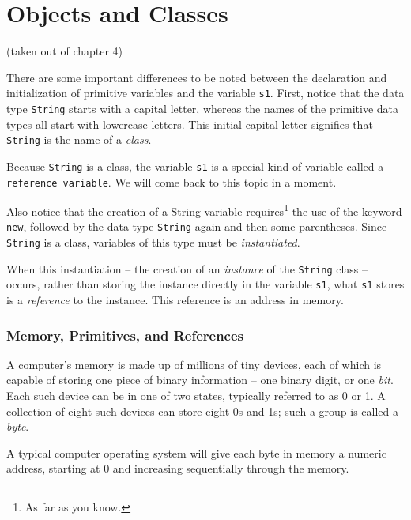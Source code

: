 
\chapter{Objects and Classes}

\minitoc

(taken out of chapter 4)

There are some important differences to be noted between the declaration and initialization of primitive variables and the variable \lstinline{s1}.  First, notice that the data type \lstinline{String} starts with a capital letter, whereas the names of the primitive data types all start with lowercase letters.  This initial capital letter signifies that \lstinline{String} is the name of a \textit{class}.

Because \lstinline{String} is a class, the variable \lstinline{s1} is a special kind of variable called a \lstinline{reference variable}.  We will come back to this topic in a moment.

Also notice that the creation of a String variable requires\footnote{As far as you know.} the use of the keyword \lstinline{new}, followed by the data type \lstinline{String} again and then some parentheses.  Since \lstinline{String} is a class, variables of this type must be \textit{instantiated}.

When this instantiation -- the creation of an \textit{instance} of the \lstinline{String} class -- occurs, rather than storing the instance directly in the variable \lstinline{s1}, what \lstinline{s1} stores is a \textit{reference} to the instance.  This reference is an address in memory.

\subsection{Memory, Primitives, and References}
A computer's memory is made up of millions of tiny devices, each of which is capable of storing one piece of binary information -- one binary digit, or one \textit{bit}.  Each such device can be in one of two states, typically referred to as 0 or 1.  A collection of eight such devices can store eight 0s and 1s; such a group is called a \textit{byte}.

A typical computer operating system will give each byte in memory a numeric address, starting at 0 and increasing sequentially through the memory.
